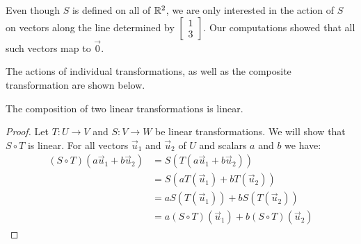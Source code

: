 \documentclass{ximera}
\begin{document}
\begin{example}
\begin{explanation}
Even though $S$ is defined on all of $\mathbb{R}^2$, we are only interested in the action of $S$ on vectors along the line determined by $\begin{bmatrix}1\\3\end{bmatrix}$.  Our computations showed that all such vectors map to $\vec{0}$.

The actions of individual transformations, as well as the composite transformation are shown below.

\begin{center}
\end{center}

\end{explanation}
\end{example}

\begin{theorem}\label{th:complinear}
The composition of two linear transformations is linear.
\end{theorem}
\begin{proof}
Let $T:U\rightarrow V$ and $S:V\rightarrow W$ be linear transformations. We will show that $S\circ T$ is linear.  For all vectors $\vec{u}_1$ and $\vec{u}_2$ of $U$ and scalars $a$ and $b$ we have:
\begin{align*}
(S\circ T)(a\vec{u}_1+b\vec{u}_2)&=S(T(a\vec{u}_1+b\vec{u}_2))\\
&=S(aT(\vec{u}_1)+bT(\vec{u}_2))\\
&=aS(T(\vec{u}_1))+bS(T(\vec{u}_2))\\
&=a(S\circ T)(\vec{u}_1)+b(S\circ T)(\vec{u}_2)
\end{align*}
\end{proof}
\end{document}
